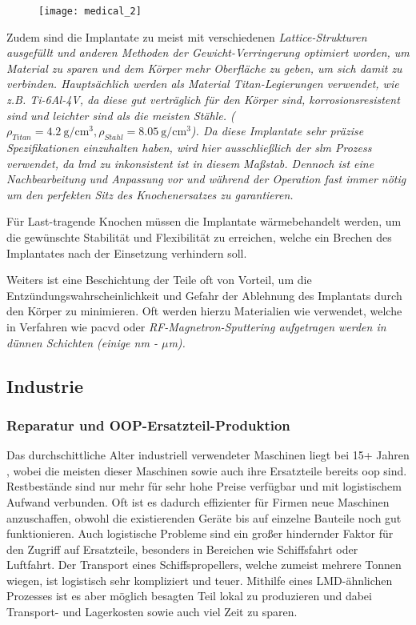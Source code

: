 \documentclass[../main.tex]{subfiles}
\begin{document}
\begin{figure}[H]
	\centering
	\texttt{[image: medical\_2]}
	\label{img:medical}
\end{figure} 
Zudem sind die Implantate zu meist mit verschiedenen \it{Lattice}-Strukturen ausgefüllt und anderen Methoden der Gewicht-Verringerung optimiert worden, um Material zu sparen und dem Körper mehr Oberfläche zu geben, um sich damit zu verbinden. Hauptsächlich werden als Material Titan-Legierungen verwendet, wie z.B. Ti-6Al-4V, da diese gut verträglich für den Körper sind, korrosionsresistent sind und leichter sind als die meisten Stähle.
($\rho_{Titan} = \qty{4.2}{\gram\per\centi\meter\cubed}, \rho_{Stahl} = \qty{8.05}{\gram\per\cm\cubed}$). \parencite{steel12709, titanium6al4v}
Da diese Implantate sehr präzise Spezifikationen einzuhalten haben, wird hier ausschließlich der \acrlong{slm} Prozess verwendet, da \acrshort{lmd} zu inkonsistent ist in diesem Maßstab. Dennoch ist eine Nachbearbeitung und Anpassung vor und während der Operation fast immer nötig um den perfekten Sitz des Knochenersatzes zu garantieren.\parencite{doi:10.1146/annurev-bioeng-082020-032402}

Für Last-tragende Knochen müssen die Implantate wärmebehandelt werden, um die gewünschte Stabilität und Flexibilität zu erreichen, welche ein Brechen des Implantates nach der Einsetzung verhindern soll.

Weiters ist eine Beschichtung der Teile oft von Vorteil, um die Entzündungswahrscheinlichkeit und Gefahr der Ablehnung des Implantats durch den Körper zu minimieren. Oft werden hierzu Materialien wie  verwendet, welche in Verfahren wie \acrfull{pacvd} oder \it{RF-Magnetron-Sputtering} aufgetragen werden in dünnen Schichten (einige nm - $\mu$m).\parencite{Chudinova2016}

 
\subsection{Industrie}
\subsubsection{Reparatur und OOP-Ersatzteil-Produktion}
Das durchschittliche Alter industriell verwendeter Maschinen liegt bei 15+ Jahren \parencite{lifespan_1}, wobei die meisten dieser Maschinen sowie auch ihre Ersatzteile bereits \acrfull{oop} sind. 
Restbestände sind nur mehr für sehr hohe Preise verfügbar und mit logistischem Aufwand verbunden. 
Oft ist es dadurch effizienter für Firmen neue Maschinen anzuschaffen, obwohl die existierenden Geräte bis auf einzelne Bauteile noch gut funktionieren. 
Auch logistische Probleme sind ein großer hindernder Faktor für den Zugriff auf Ersatzteile, besonders in Bereichen wie Schiffsfahrt oder Luftfahrt. Der Transport eines Schiffspropellers, welche zumeist mehrere Tonnen wiegen, ist logistisch sehr kompliziert und teuer.  
Mithilfe eines LMD-ähnlichen Prozesses ist es aber möglich besagten Teil lokal zu produzieren \parencite{ship_1} und dabei Transport- und Lagerkosten sowie auch viel Zeit zu sparen. 
\end{document}
